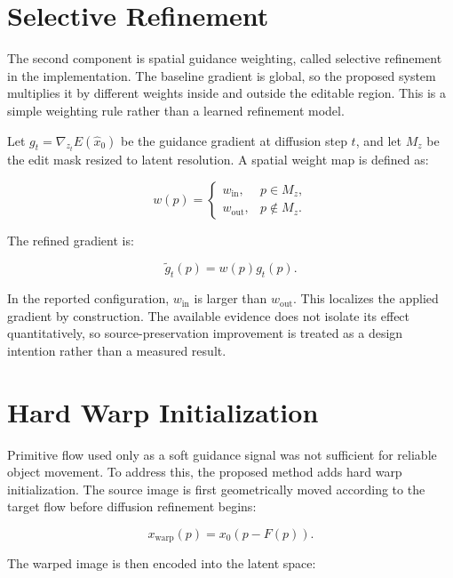 \section{Selective Refinement}

The second component is spatial guidance weighting, called selective refinement in the implementation. The baseline gradient is global, so the proposed system multiplies it by different weights inside and outside the editable region. This is a simple weighting rule rather than a learned refinement model.

Let $g_t=\nabla_{z_t}E(\hat{x}_0)$ be the guidance gradient at diffusion step $t$, and let $M_z$ be the edit mask resized to latent resolution. A spatial weight map is defined as:

\begin{equation}
w(p)=
\begin{cases}
w_{\mathrm{in}}, & p \in M_z,\\
w_{\mathrm{out}}, & p \notin M_z.
\end{cases}
\label{eq:selective-weight}
\end{equation}

The refined gradient is:

\begin{equation}
\tilde{g}_t(p)=w(p)g_t(p).
\label{eq:selective-gradient}
\end{equation}

In the reported configuration, $w_{\mathrm{in}}$ is larger than $w_{\mathrm{out}}$. This localizes the applied gradient by construction. The available evidence does not isolate its effect quantitatively, so source-preservation improvement is treated as a design intention rather than a measured result.

\section{Hard Warp Initialization}

Primitive flow used only as a soft guidance signal was not sufficient for reliable object movement. To address this, the proposed method adds hard warp initialization. The source image is first geometrically moved according to the target flow before diffusion refinement begins:

\begin{equation}
x_{\mathrm{warp}}(p)=x_0(p-F(p)).
\label{eq:hard-warp}
\end{equation}

The warped image is then encoded into the latent space:

